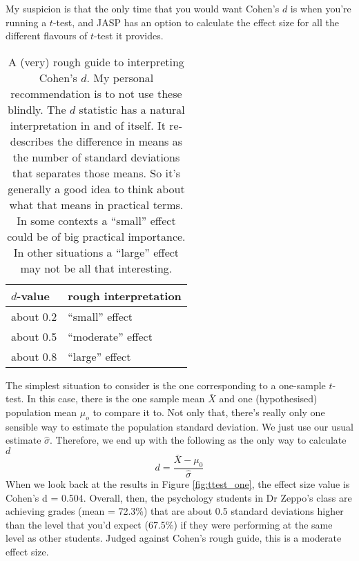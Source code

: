 My suspicion is that the only time that you would want Cohen's $d$ is when you're running a $t$-test, and JASP has an option to calculate the effect size for all the different flavours of $t$-test it provides. 

\begin{table}[t]
\caption{A (very) rough guide to interpreting Cohen's $d$. My personal recommendation is to not use these blindly. The $d$ statistic has a natural interpretation in and of itself. It re-describes the difference in means as the number of standard deviations that separates those means. So it's generally a good idea to think about what that means in practical terms. In some contexts a ``small'' effect could be of big practical importance. In other situations a ``large'' effect may not be all that interesting.} 
\label{tab:cohensdinterpretation}
\centering
\vspace*{6pt}
\begin{tabular}{l|l}
$d$-value & rough interpretation \\ \hline
about 0.2 & ``small'' effect  \\
about 0.5 & ``moderate'' effect \\
about 0.8 & ``large'' effect 
\end{tabular}
\vspace*{6pt}
\HR
\end{table}


The simplest situation to consider is the one corresponding to a one-sample $t$-test. In this case, there is the one sample mean $\bar{X}$ and one (hypothesised) population mean $\mu_o$ to compare it to. Not only that, there's really only one sensible way to estimate the population standard deviation. We just use our usual estimate $\hat{\sigma}$. Therefore, we end up with the following as the only way to calculate $d$
$$
d = \frac{\bar{X} - \mu_0}{\hat{\sigma}}
$$
When we look back at the results in Figure \ref{fig:ttest_one}, the effect size value is Cohen's d = 0.504. Overall, then, the psychology students in Dr Zeppo's class are achieving grades (mean = 72.3\%) that are about 0.5 standard deviations higher than the level that you'd expect (67.5\%) if they were performing at the same level as other students. Judged against Cohen's rough guide, this is a moderate effect size.



